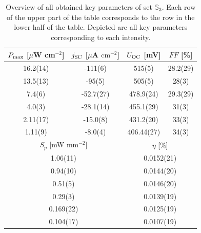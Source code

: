 \begin{table}[ht]
\caption{Overview of all obtained key parameters of set $\mathbb{S}_3$. Each row of the upper part of the table corresponds to the row in the lower half of the table. Depicted are all key parameters corresponding to each intensity.}
\label{tab:OSC3table}
\begin{tabular}{@{}cccc@{}}
\toprule
$P_{\text{max}}$ [$\mu$W cm$^{-2}$] & $j_{\text{SC}}$ [$\mu$A $\mathrm{cm}^{-2}$] & $U_{\text{OC}}$ [mV]     & $FF$ [\%]     \\ \midrule
16.2(14)                   & -111(6)                            & 515(5)          & 28.2(29)      \\
13.5(13)                   & -95(5)                             & 505(5)          & 28(3)         \\
7.4(6)                     & -52.7(27)                          & 478.9(24)       & 29.3(29)      \\
4.0(3)                     & -28.1(14)                          & 455.1(29)       & 31(3)         \\
2.11(17)                   & -15.0(8)                           & 431.2(20)       & 33(3)         \\
1.11(9)                    & -8.0(4)                            & 406.44(27)      & 34(3)         \\ \midrule
\multicolumn{2}{c}{$S_p$ [mW mm$^{-2}$]}                        & \multicolumn{2}{c}{$\eta$ [\%]} \\ \midrule
\multicolumn{2}{c}{1.06(11)}                                    & \multicolumn{2}{c}{0.0152(21)}  \\
\multicolumn{2}{c}{0.94(10)}                                    & \multicolumn{2}{c}{0.0144(20)}  \\
\multicolumn{2}{c}{0.51(5)}                                     & \multicolumn{2}{c}{0.0146(20)}  \\
\multicolumn{2}{c}{0.29(3)}                                     & \multicolumn{2}{c}{0.0139(19)}  \\
\multicolumn{2}{c}{0.169(22)}                                   & \multicolumn{2}{c}{0.0125(19)}  \\
\multicolumn{2}{c}{0.104(17)}                                   & \multicolumn{2}{c}{0.0107(19)}  \\ \bottomrule
\end{tabular}
\end{table}

